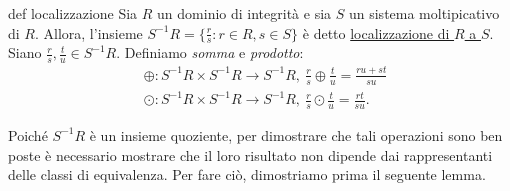\begin{defn}{def localizzazione}
  Sia $R$ un dominio di integrità e sia $S$ un sistema moltipicativo di $R$. Allora, l'insieme $S^{-1}R=\{\frac{r}{s}: r\in R,s\in S\}$ 
  è detto \underline{localizzazione di $R$ a $S$}.
  Siano $\frac{r}{s}, \frac{t}{u} \in S^{-1}R$. Definiamo \emph{somma} e \emph{prodotto}:
  \begin{align*}
  &\oplus\colon S^{-1}R\times S^{-1}R\to S^{-1}R,\ \frac{r}{s}\oplus\frac{t}{u}=\frac{ru+st}{su} \\
  &\odot \colon S^{-1}R\times S^{-1}R\to S^{-1}R,\ \frac{r}{s}\odot \frac{t}{u}=\frac{rt}{su}.
  \end{align*}
\end{defn}
\begin{obs}
  Poiché $S^{-1}R$ è un insieme quoziente, per dimostrare che tali operazioni sono ben poste è necessario 
  mostrare che il loro risultato non dipende dai rappresentanti delle classi di equivalenza. 
  Per fare ciò, dimostriamo prima il seguente lemma.
\end{obs}

